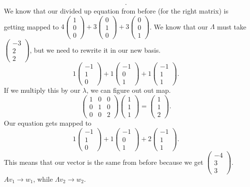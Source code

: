 \begin{eg}
\begin{align*}
  .\end{align*}
  We know that our divided up equation from before (for the right matrix) is getting mapped to $4\begin{pmatrix} 1\\0\\0 \end{pmatrix} +3\begin{pmatrix} 0\\1\\0 \end{pmatrix} +3\begin{pmatrix} 0\\0\\1 \end{pmatrix} $. We know that our $\Lambda$ must take $\begin{pmatrix} -3\\2\\2 \end{pmatrix} $, but we need to rewrite it in our new basis.\[
  1\begin{pmatrix} -1\\1\\0 \end{pmatrix} +1\begin{pmatrix} -1\\0\\1 \end{pmatrix} +1\begin{pmatrix} -1\\1\\1 \end{pmatrix} 
  .\] 
  If we multiply this by our $\lambda$, we can figure out out map. \[
    \begin{pmatrix} 1&0&0\\0&1&0\\0&0&2 \end{pmatrix} \begin{pmatrix} 1\\1\\1 \end{pmatrix} =\begin{pmatrix} 1\\1\\2 \end{pmatrix} 
  .\] 
  Our equation gets mapped to \[
  1\begin{pmatrix} -1\\1\\0 \end{pmatrix} +1\begin{pmatrix} -1\\0\\1 \end{pmatrix} +2\begin{pmatrix} -1\\1\\1 \end{pmatrix} 
  .\] 
  This means that our vector is the same from before because we get $\begin{pmatrix} -4\\3\\3 \end{pmatrix} $.\newline
  $Av_1\to w_1$, while $\Lambda v_2\to w_2$.
\end{eg}
